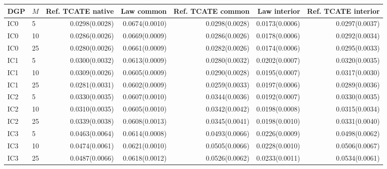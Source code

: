 \begin{table}[t]
\begin{tabular}{llrrrrr}
DGP & $M$ & Ref. TCATE native & Law common & Ref. TCATE common & Law interior & Ref. TCATE interior \\
\midrule
IC0 & 5 & 0.0298(0.0028) & 0.0674(0.0010) & 0.0298(0.0028) & 0.0173(0.0006) & 0.0297(0.0037) \\
IC0 & 10 & 0.0286(0.0026) & 0.0669(0.0009) & 0.0286(0.0026) & 0.0178(0.0006) & 0.0292(0.0034) \\
IC0 & 25 & 0.0280(0.0026) & 0.0661(0.0009) & 0.0282(0.0026) & 0.0174(0.0006) & 0.0295(0.0033) \\
IC1 & 5 & 0.0300(0.0032) & 0.0613(0.0009) & 0.0280(0.0032) & 0.0202(0.0007) & 0.0320(0.0035) \\
IC1 & 10 & 0.0309(0.0026) & 0.0605(0.0009) & 0.0290(0.0028) & 0.0195(0.0007) & 0.0317(0.0030) \\
IC1 & 25 & 0.0281(0.0031) & 0.0602(0.0009) & 0.0259(0.0033) & 0.0197(0.0006) & 0.0289(0.0036) \\
IC2 & 5 & 0.0330(0.0035) & 0.0607(0.0010) & 0.0344(0.0036) & 0.0192(0.0007) & 0.0330(0.0035) \\
IC2 & 10 & 0.0310(0.0035) & 0.0605(0.0010) & 0.0342(0.0042) & 0.0198(0.0008) & 0.0315(0.0034) \\
IC2 & 25 & 0.0339(0.0038) & 0.0608(0.0013) & 0.0345(0.0041) & 0.0198(0.0010) & 0.0331(0.0040) \\
IC3 & 5 & 0.0463(0.0064) & 0.0614(0.0008) & 0.0493(0.0066) & 0.0226(0.0009) & 0.0498(0.0062) \\
IC3 & 10 & 0.0474(0.0061) & 0.0621(0.0010) & 0.0505(0.0066) & 0.0228(0.0010) & 0.0506(0.0067) \\
IC3 & 25 & 0.0487(0.0066) & 0.0618(0.0012) & 0.0526(0.0062) & 0.0233(0.0011) & 0.0534(0.0061) \\
\bottomrule
\end{tabular}
\end{table}
